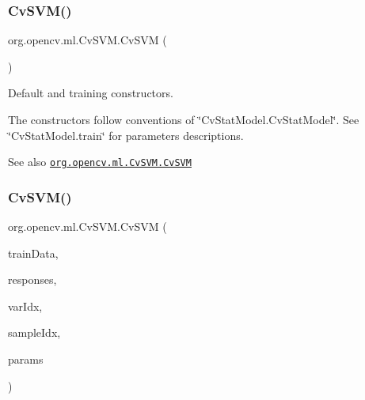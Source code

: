 \mbox{\label{classorg_1_1opencv_1_1ml_1_1_cv_s_v_m_ac99a9f7445996e98af48b55d396541d7}} 
\subsubsection{\texorpdfstring{Cv\+S\+V\+M()}{CvSVM()}\hspace{0.1cm}{\footnotesize\ttfamily [2/4]}}
{\footnotesize\ttfamily org.\+opencv.\+ml.\+Cv\+S\+V\+M.\+Cv\+S\+VM (\begin{DoxyParamCaption}{ }\end{DoxyParamCaption})}

Default and training constructors.

The constructors follow conventions of \char`\"{}\+Cv\+Stat\+Model.\+Cv\+Stat\+Model\char`\"{}. See \char`\"{}\+Cv\+Stat\+Model.\+train\char`\"{} for parameters descriptions.

\begin{DoxySeeAlso}{See also}
\href{http://docs.opencv.org/modules/ml/doc/support_vector_machines.html#cvsvm-cvsvm}{\tt org.\+opencv.\+ml.\+Cv\+S\+V\+M.\+Cv\+S\+VM} 
\end{DoxySeeAlso}
\mbox{\label{classorg_1_1opencv_1_1ml_1_1_cv_s_v_m_a5ffb88bb8e1bbb45de899f51b69d943e}} 
\subsubsection{\texorpdfstring{Cv\+S\+V\+M()}{CvSVM()}\hspace{0.1cm}{\footnotesize\ttfamily [3/4]}}
{\footnotesize\ttfamily org.\+opencv.\+ml.\+Cv\+S\+V\+M.\+Cv\+S\+VM (\begin{DoxyParamCaption}\item[{\mbox{\hyperlink{classorg_1_1opencv_1_1core_1_1_mat}{Mat}}}]{train\+Data,  }\item[{\mbox{\hyperlink{classorg_1_1opencv_1_1core_1_1_mat}{Mat}}}]{responses,  }\item[{\mbox{\hyperlink{classorg_1_1opencv_1_1core_1_1_mat}{Mat}}}]{var\+Idx,  }\item[{\mbox{\hyperlink{classorg_1_1opencv_1_1core_1_1_mat}{Mat}}}]{sample\+Idx,  }\item[{\mbox{\hyperlink{classorg_1_1opencv_1_1ml_1_1_cv_s_v_m_params}{Cv\+S\+V\+M\+Params}}}]{params }\end{DoxyParamCaption})}

